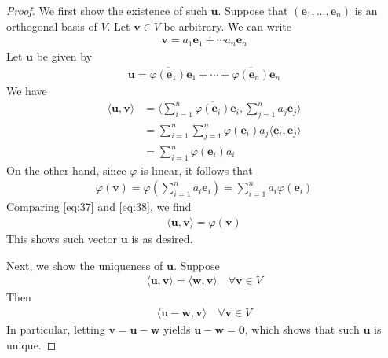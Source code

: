\documentclass[thmcnt=section, color=blue, 12pt]{my-elegantbook}
\begin{document}
\begin{proof}
	We first show the existence of such $\mathbf{u}$.
	Suppose that $(\mathbf{e}_1, \ldots, \mathbf{e}_n)$
	is an orthogonal basis of $V$.
	Let $\mathbf{v} \in V$ be arbitrary.
	We can write 
	\begin{align*}
		\mathbf{v} = a_1 \mathbf{e}_1 + \cdots a_n \mathbf{e}_n
	\end{align*}
	Let $\mathbf{u}$ be given by 
	\begin{align*}
		\mathbf{u} = \overline{\varphi(\mathbf{e}_1)} \mathbf{e}_1 
			+ \cdots + \overline{\varphi(\mathbf{e}_n)} \mathbf{e}_n
	\end{align*}
	We have
	\begin{align}
		\langle \mathbf{u}, \mathbf{v} \rangle
		&= \langle \sum_{i=1}^n \overline{\varphi(\mathbf{e}_i)} \mathbf{e}_i,
		\sum_{j=1}^n a_j \mathbf{e}_j \rangle \nonumber \\
		&= \sum_{i=1}^n \sum_{j=1}^n \varphi(\mathbf{e}_i) a_j 
		\langle \mathbf{e}_i, \mathbf{e}_j \rangle \nonumber \\
		&= \sum_{i=1}^n \varphi(\mathbf{e}_i) a_i
		\label{eq:37}
	\end{align}
	On the other hand, since $\varphi$ is linear, it follows that 
	\begin{align}
		\varphi(\mathbf{v}) 
		= \varphi(\sum_{i=1}^n a_i \mathbf{e}_i)
		= \sum_{i=1}^n a_i \varphi(\mathbf{e}_i)
		\label{eq:38}
	\end{align}
	Comparing \eqref{eq:37} and \eqref{eq:38}, we find 
	\begin{align*}
		\langle \mathbf{u}, \mathbf{v} \rangle
		= \varphi(\mathbf{v})
	\end{align*}
	This shows such vector $\mathbf{u}$ is as desired.

	Next, we show the uniqueness of $\mathbf{u}$.
	Suppose
	\begin{align*}
		\langle \mathbf{u}, \mathbf{v} \rangle
		= \langle \mathbf{w}, \mathbf{v} \rangle
		\quad \forall \mathbf{v} \in V
	\end{align*}
	Then 
	\begin{align*}
		\langle \mathbf{u} - \mathbf{w}, \mathbf{v} \rangle
		\quad \forall \mathbf{v} \in V
	\end{align*}
	In particular, letting $\mathbf{v} = \mathbf{u} - \mathbf{w}$
	yields $\mathbf{u} - \mathbf{w} = \mathbf{0}$,
	which shows that such $\mathbf{u}$ is unique.
\end{proof}

\end{document}
